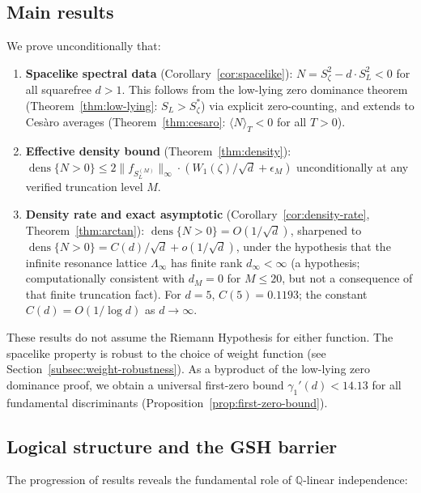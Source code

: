 \documentclass[12pt,reqno]{amsart}
\theoremstyle{plain}
\theoremstyle{definition}
\theoremstyle{remark}
\DeclareMathOperator{\dens}{dens}
\newcommand{\Q}{\mathbb{Q}}
\begin{document}
\subsection{Main results}

We prove unconditionally that:

\begin{enumerate}[label=\textup{(\arabic*)}]
\item \textbf{Spacelike spectral data} (Corollary~\ref{cor:spacelike}): $N = S_\zeta^2 - d \cdot S_L^2 < 0$ for all squarefree $d > 1$.  This follows from the low-lying zero dominance theorem (Theorem~\ref{thm:low-lying}: $S_L > S_\zeta^*$) via explicit zero-counting, and extends to Ces\`aro averages (Theorem~\ref{thm:cesaro}: $\langle N \rangle_T < 0$ for all $T > 0$).

\item \textbf{Effective density bound} (Theorem~\ref{thm:density}): $\dens\{N > 0\} \leq 2\|f_{S_L^{(M)}}\|_\infty \cdot (W_1(\zeta)/\sqrt{d} + \epsilon_M)$ unconditionally at any verified truncation level $M$.

\item \textbf{Density rate and exact asymptotic} (Corollary~\ref{cor:density-rate}, Theorem~\ref{thm:arctan}): $\dens\{N > 0\} = O(1/\sqrt{d})$, sharpened to $\dens\{N > 0\} = C(d)/\sqrt{d} + o(1/\sqrt{d})$, under the hypothesis that the infinite resonance lattice $\Lambda_\infty$ has finite rank $d_\infty < \infty$ (a hypothesis; computationally consistent with $d_M = 0$ for $M \leq 20$, but not a consequence of that finite truncation fact).  For $d = 5$, $C(5) = 0.1193$; the constant $C(d) = O(1/\log d)$ as $d \to \infty$.
\end{enumerate}

These results do not assume the Riemann Hypothesis for either function. The spacelike property is robust to the choice of weight function (see Section~\ref{subsec:weight-robustness}).  As a byproduct of the low-lying zero dominance proof, we obtain a universal first-zero bound $\gamma_1'(d) < 14.13$ for all fundamental discriminants (Proposition~\ref{prop:first-zero-bound}).

\subsection{Logical structure and the GSH barrier}

The progression of results reveals the fundamental role of $\Q$-linear independence:
\end{document}
